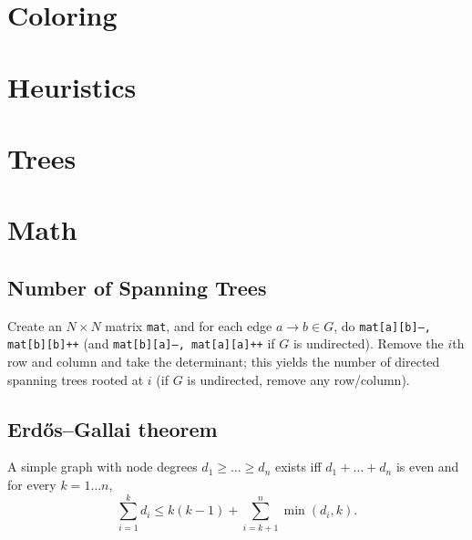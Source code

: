 \section{Coloring}

\section{Heuristics}

\section{Trees}

\section{Math}
	\subsection{Number of Spanning Trees}
		Create an $N\times N$ matrix \texttt{mat}, and for each edge $a \rightarrow b \in G$, do
		\texttt{mat[a][b]--, mat[b][b]++} (and \texttt{mat[b][a]--, mat[a][a]++} if $G$ is undirected).
		Remove the $i$th row and column and take the determinant; this yields the number of directed spanning trees rooted at $i$
		(if $G$ is undirected, remove any row/column).


	\subsection{Erdős–Gallai theorem}
		A simple graph with node degrees $d_1 \ge \dots \ge d_n$ exists iff $d_1 + \dots + d_n$ is even and for every $k = 1\dots n$,
		\[ \sum _{i=1}^{k}d_{i}\leq k(k-1)+\sum _{i=k+1}^{n}\min(d_{i},k). \]
